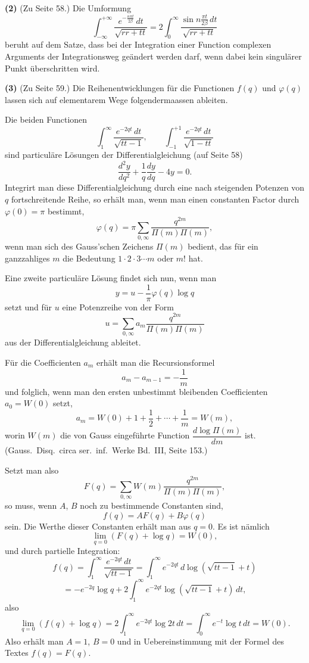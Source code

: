 \documentclass[12pt,a4paper]{article}
\begin{document}
\textbf{(2)} (Zu Seite 58.) Die Umformung
\[
\int_{-\infty}^{+\infty} \frac{e^{-\frac{n\pi t}{2\beta}}\, dt}{\sqrt{rr + tt}} = 2 \int_0^{\infty} \frac{\sin n\frac{\pi t}{2\beta}\, dt}{\sqrt{rr + tt}}
\]
beruht auf dem Satze, dass bei der Integration einer Function complexen Arguments der Integrationsweg geändert werden darf, wenn dabei kein singulärer Punkt überschritten wird.

\textbf{(3)} (Zu Seite 59.) Die Reihenentwicklungen für die Functionen $f(q)$ und $\varphi(q)$ lassen sich auf elementarem Wege folgendermaassen ableiten.

Die beiden Functionen
\[
\int_1^{\infty} \frac{e^{-2qt}\, dt}{\sqrt{tt-1}}, \qquad \int_{-1}^{+1} \frac{e^{-2qt}\, dt}{\sqrt{1-tt}}
\]
sind particuläre Lösungen der Differentialgleichung (auf Seite 58)
\[
\frac{d^2 y}{dq^2} + \frac{1}{q}\frac{dy}{dq} - 4y = 0.
\]
Integrirt man diese Differentialgleichung durch eine nach steigenden Potenzen von $q$ fortschreitende Reihe, so erhält man, wenn man einen constanten Factor durch $\varphi(0) = \pi$ bestimmt,
\[
\varphi(q) = \pi \sum_{0,\infty} \frac{q^{2m}}{\Pi(m)\Pi(m)},
\]
 wenn man sich des Gauss'schen Zeichens $\Pi(m)$ bedient, das für ein ganzzahliges $m$ die Bedeutung $1 \cdot 2 \cdot 3 \cdots m$ oder $m!$ hat.

Eine zweite particuläre Lösung findet sich nun, wenn man
\[
y = u - \frac{1}{\pi} \varphi(q) \log q
\]
setzt und für $u$ eine Potenzreihe von der Form
\[
u = \sum_{0,\infty} a_m \frac{q^{2m}}{\Pi(m)\Pi(m)}
\]
aus der Differentialgleichung ableitet.

Für die Coefficienten $a_m$ erhält man die Recursionsformel
\[
a_m - a_{m-1} = -\frac{1}{m}
\]
und folglich, wenn man den ersten unbestimmt bleibenden Coefficienten $a_0 = W(0)$ setzt,
\[
a_m = W(0) + 1 + \frac{1}{2} + \cdots + \frac{1}{m} = W(m),
\]
worin $W(m)$ die von Gauss eingeführte Function $\dfrac{d\log\Pi(m)}{dm}$ ist. (Gauss.\ Disq.\ circa ser.\ inf.\ Werke Bd.~III, Seite 153.)

Setzt man also
\[
F(q) = \sum_{0,\infty} W(m) \frac{q^{2m}}{\Pi(m)\Pi(m)},
\]
so muss, wenn $A$, $B$ noch zu bestimmende Constanten sind,
\[
f(q) = AF(q) + B\varphi(q)
\]
sein. Die Werthe dieser Constanten erhält man aus $q = 0$. Es ist nämlich
\[
\lim_{q=0} (F(q) + \log q) = W(0),
\]
und durch partielle Integration:
\[
f(q) = \int_1^{\infty} \frac{e^{-2qt}\, dt}{\sqrt{tt-1}} = \int_1^{\infty} e^{-2qt}\, d\log(\sqrt{tt-1} + t)
\]
\[
= -e^{-2q}\log q + 2\int_1^{\infty} e^{-2qt} \log(\sqrt{tt-1} + t)\, dt,
\]
also
\[
\lim_{q=0} (f(q) + \log q) = 2\int_1^{\infty} e^{-2qt} \log 2t\, dt = \int_0^{\infty} e^{-t} \log t\, dt = W(0).
\]
Also erhält man $A = 1$, $B = 0$ und in Uebereinstimmung mit der Formel des Textes $f(q) = F(q)$.
\end{document}
